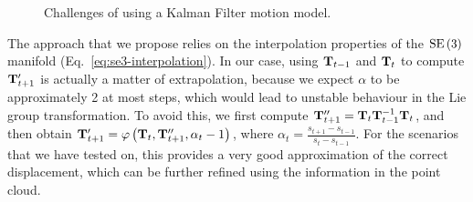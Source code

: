 \begin{figure}
	\centering
	\hspace{1pt}
	\caption[Motion model challenges]{Challenges of using a Kalman Filter motion model.}
	\label{fig:motion-pred-trouble}
\end{figure}


The approach that we propose relies on the interpolation properties of the $\operatorname{SE}\left(3\right)$ manifold (Eq.~\ref{eq:se3-interpolation}). In our case, using $\mathbf{T}_{t-1}$ and $\mathbf{T}_{t}$ to compute $\mathbf{T}_{t+1}'$ is actually a matter of extrapolation, because we expect $\alpha$ to be approximately 2 at most steps, which would lead to unstable behaviour in the Lie group transformation. To avoid this, we first compute $\mathbf{T}_{t+1}'' = \mathbf{T}_{t}\mathbf{T}_{t-1}^{-1}\mathbf{T}_{t}$, and then obtain $\mathbf{T}_{t+1}' = \varphi\left(\mathbf{T}_t, \mathbf{T}_{t+1}'', \alpha_{t}-1\right)$, where $\alpha_{t}= \frac{s_{t+1} - s_{t-1}}{s_t - s_{t-1}}$. For the scenarios that we have tested on, this provides a very good approximation of the correct displacement, which can be further refined using the information in the point cloud.

